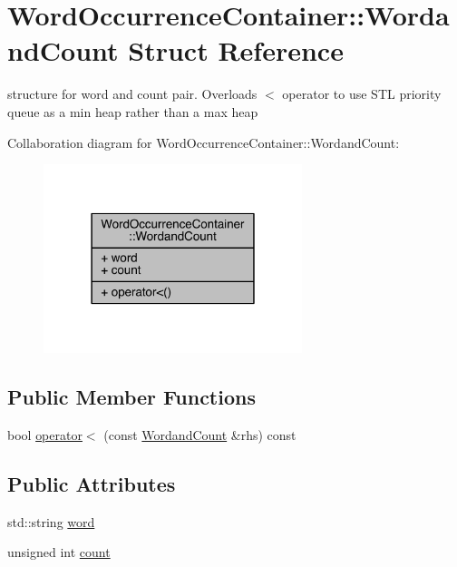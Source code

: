 \hypertarget{struct_word_occurrence_container_1_1_wordand_count}{}\section{Word\+Occurrence\+Container\+:\+:Wordand\+Count Struct Reference}
\label{struct_word_occurrence_container_1_1_wordand_count}


structure for word and count pair. Overloads $<$ operator to use S\+TL priority queue as a min heap rather than a max heap  




Collaboration diagram for Word\+Occurrence\+Container\+:\+:Wordand\+Count\+:\nopagebreak
\begin{figure}[H]
\begin{center}
\leavevmode
\includegraphics[width=214pt]{struct_word_occurrence_container_1_1_wordand_count__coll__graph}
\end{center}
\end{figure}
\subsection*{Public Member Functions}
\begin{DoxyCompactItemize}
\item 
bool \mbox{\hyperlink{struct_word_occurrence_container_1_1_wordand_count_a6922cc342d2df02f2786a5f1e676c7c0}{operator$<$}} (const \mbox{\hyperlink{struct_word_occurrence_container_1_1_wordand_count}{Wordand\+Count}} \&rhs) const
\end{DoxyCompactItemize}
\subsection*{Public Attributes}
\begin{DoxyCompactItemize}
\item 
std\+::string \mbox{\hyperlink{struct_word_occurrence_container_1_1_wordand_count_a7350d13d7a0942fb29f92826e6133252}{word}}
\item 
unsigned int \mbox{\hyperlink{struct_word_occurrence_container_1_1_wordand_count_ad1ee36cdf02e30c4c2de82cd47fc093b}{count}}
\end{DoxyCompactItemize}


